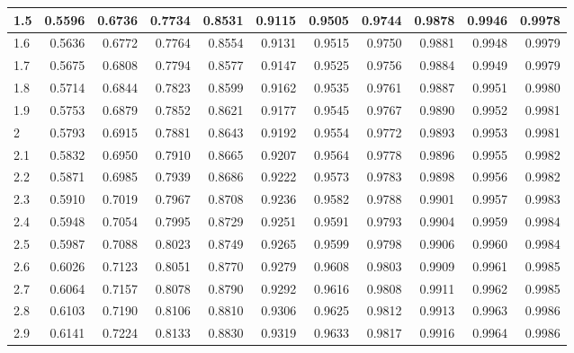 \documentclass[
  12pt,
]{book}
\theoremstyle{definition}
\theoremstyle{definition}
\theoremstyle{definition}
\theoremstyle{definition}
\theoremstyle{remark}
\begin{document}
\begin{table}
\begin{tabular}[t]{l|r|r|r|r|r|r|r|r|r|r}
\hline
1.5 & 0.5596 & 0.6736 & 0.7734 & 0.8531 & 0.9115 & 0.9505 & 0.9744 & 0.9878 & 0.9946 & 0.9978\\
\hline
1.6 & 0.5636 & 0.6772 & 0.7764 & 0.8554 & 0.9131 & 0.9515 & 0.9750 & 0.9881 & 0.9948 & 0.9979\\
\hline
1.7 & 0.5675 & 0.6808 & 0.7794 & 0.8577 & 0.9147 & 0.9525 & 0.9756 & 0.9884 & 0.9949 & 0.9979\\
\hline
1.8 & 0.5714 & 0.6844 & 0.7823 & 0.8599 & 0.9162 & 0.9535 & 0.9761 & 0.9887 & 0.9951 & 0.9980\\
\hline
1.9 & 0.5753 & 0.6879 & 0.7852 & 0.8621 & 0.9177 & 0.9545 & 0.9767 & 0.9890 & 0.9952 & 0.9981\\
\hline
2 & 0.5793 & 0.6915 & 0.7881 & 0.8643 & 0.9192 & 0.9554 & 0.9772 & 0.9893 & 0.9953 & 0.9981\\
\hline
2.1 & 0.5832 & 0.6950 & 0.7910 & 0.8665 & 0.9207 & 0.9564 & 0.9778 & 0.9896 & 0.9955 & 0.9982\\
\hline
2.2 & 0.5871 & 0.6985 & 0.7939 & 0.8686 & 0.9222 & 0.9573 & 0.9783 & 0.9898 & 0.9956 & 0.9982\\
\hline
2.3 & 0.5910 & 0.7019 & 0.7967 & 0.8708 & 0.9236 & 0.9582 & 0.9788 & 0.9901 & 0.9957 & 0.9983\\
\hline
2.4 & 0.5948 & 0.7054 & 0.7995 & 0.8729 & 0.9251 & 0.9591 & 0.9793 & 0.9904 & 0.9959 & 0.9984\\
\hline
2.5 & 0.5987 & 0.7088 & 0.8023 & 0.8749 & 0.9265 & 0.9599 & 0.9798 & 0.9906 & 0.9960 & 0.9984\\
\hline
2.6 & 0.6026 & 0.7123 & 0.8051 & 0.8770 & 0.9279 & 0.9608 & 0.9803 & 0.9909 & 0.9961 & 0.9985\\
\hline
2.7 & 0.6064 & 0.7157 & 0.8078 & 0.8790 & 0.9292 & 0.9616 & 0.9808 & 0.9911 & 0.9962 & 0.9985\\
\hline
2.8 & 0.6103 & 0.7190 & 0.8106 & 0.8810 & 0.9306 & 0.9625 & 0.9812 & 0.9913 & 0.9963 & 0.9986\\
\hline
2.9 & 0.6141 & 0.7224 & 0.8133 & 0.8830 & 0.9319 & 0.9633 & 0.9817 & 0.9916 & 0.9964 & 0.9986\\
\hline
\end{tabular}
\end{table}
\end{document}
